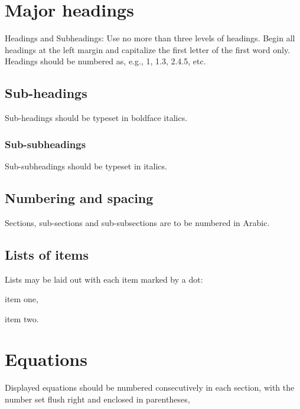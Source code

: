 \documentclass{ws-ijm}
\begin{document}
\section{Major headings}
Headings and Subheadings: Use no more than three levels of headings. Begin all headings at the left margin and capitalize the first letter of the first word only. Headings should be numbered as, e.g., 1, 1.3, 2.4.5, etc.

\subsection{Sub-headings}
Sub-headings should be typeset in boldface italics.

\subsubsection{Sub-subheadings}
Sub-subheadings should be typeset in italics.

\subsection{Numbering and spacing}
Sections, sub-sections and sub-subsections are to be numbered in
Arabic.

\subsection{Lists of items}
Lists may be laid out with each item marked by a dot:

\begin{itemlist}
 \item item one,
 \item item two.
\end{itemlist}


\section{Equations}
Displayed equations should be numbered consecutively in each
section, with the number set flush right and enclosed in
parentheses,
\end{document}
